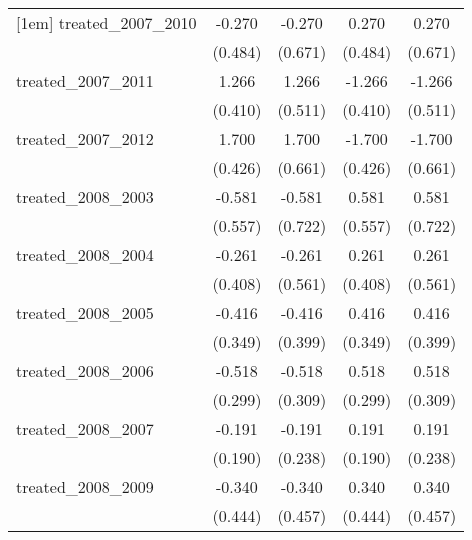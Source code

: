 {\begin{tabular}{l*{4}{c}}
[1em]
treated\_2007\_2010&      -0.270         &      -0.270         &       0.270         &       0.270         \\
            &     (0.484)         &     (0.671)         &     (0.484)         &     (0.671)         \\
[1em]
treated\_2007\_2011&       1.266\sym{**} &       1.266\sym{*}  &      -1.266\sym{**} &      -1.266\sym{*}  \\
            &     (0.410)         &     (0.511)         &     (0.410)         &     (0.511)         \\
[1em]
treated\_2007\_2012&       1.700\sym{***}&       1.700\sym{*}  &      -1.700\sym{***}&      -1.700\sym{*}  \\
            &     (0.426)         &     (0.661)         &     (0.426)         &     (0.661)         \\
[1em]
treated\_2008\_2003&      -0.581         &      -0.581         &       0.581         &       0.581         \\
            &     (0.557)         &     (0.722)         &     (0.557)         &     (0.722)         \\
[1em]
treated\_2008\_2004&      -0.261         &      -0.261         &       0.261         &       0.261         \\
            &     (0.408)         &     (0.561)         &     (0.408)         &     (0.561)         \\
[1em]
treated\_2008\_2005&      -0.416         &      -0.416         &       0.416         &       0.416         \\
            &     (0.349)         &     (0.399)         &     (0.349)         &     (0.399)         \\
[1em]
treated\_2008\_2006&      -0.518         &      -0.518         &       0.518         &       0.518         \\
            &     (0.299)         &     (0.309)         &     (0.299)         &     (0.309)         \\
[1em]
treated\_2008\_2007&      -0.191         &      -0.191         &       0.191         &       0.191         \\
            &     (0.190)         &     (0.238)         &     (0.190)         &     (0.238)         \\
[1em]
treated\_2008\_2009&      -0.340         &      -0.340         &       0.340         &       0.340         \\
            &     (0.444)         &     (0.457)         &     (0.444)         &     (0.457)         \\

\end{tabular}}
